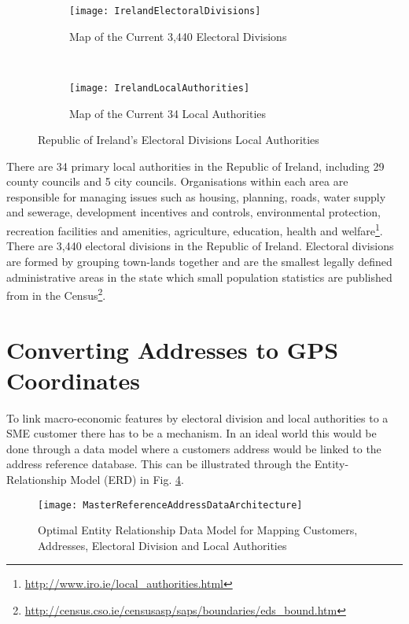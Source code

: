 \begin{figure}[H]
	\begin{subfigure}[b]{0.5\textwidth}
		\captionsetup{font=scriptsize}
		\texttt{[image: IrelandElectoralDivisions]}
		\caption{Map of the Current 3,440 Electoral Divisions}\label{fig:IrelandElectoralDivisions}
	\end{subfigure} ~\quad
	\begin{subfigure}[b]{0.5\textwidth}
		\captionsetup{font=scriptsize}
		\texttt{[image: IrelandLocalAuthorities]}
		\caption{Map of the Current 34 Local Authorities}\label{fig:IrelandLocalAuthorities}
	\end{subfigure}
	\caption{Republic of Ireland's Electoral Divisions Local Authorities}
	\label{fig:Ireland_ED_LA_Example}
\end{figure}

There are 34 primary local authorities in the Republic of Ireland, including 29 county councils and 5 city councils. Organisations within each area are responsible for managing issues such as housing, planning, roads, water supply and sewerage, development incentives and controls, environmental protection, recreation facilities and amenities, agriculture, education, health and welfare\footnote{\url{http://www.iro.ie/local_authorities.html}}. There are 3,440 electoral divisions in the Republic of Ireland. Electoral divisions are formed by grouping town-lands together and are the smallest legally defined administrative areas in the state which small population statistics are published from in the Census\footnote{\url{http://census.cso.ie/censusasp/saps/boundaries/eds_bound.htm}}.


\section{Converting Addresses to GPS Coordinates}
To link macro-economic features by electoral division and local authorities to a SME customer there has to be a mechanism. In an ideal world this would be done through a data model where a customers address would be linked to the address reference database. This can be illustrated through the Entity-Relationship Model (ERD) in Fig. \ref{fig:MasterReferenceAddressDataArchitecture}.

\begin{figure}[H]
	\texttt{[image: MasterReferenceAddressDataArchitecture]}
	\caption{Optimal Entity Relationship Data Model for Mapping Customers, Addresses, Electoral Division and Local Authorities}
	\label{fig:MasterReferenceAddressDataArchitecture}
\end{figure}

